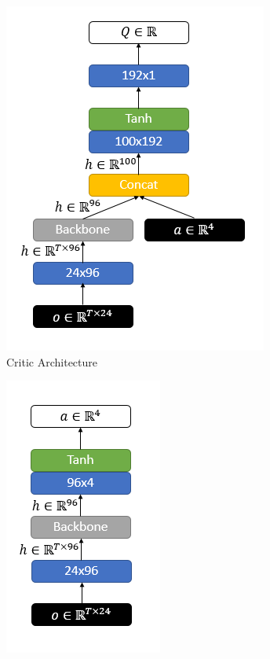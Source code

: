 \begin{figure}
	\begin{subfigure}{.5\textwidth}
		\centering
		\includegraphics[width=0.97\linewidth]{figures/nets/critic.png}
		\caption{Critic Architecture}
		\label{fig:critic_net}
	\end{subfigure}
	\begin{subfigure}{.5\textwidth}
		\centering
		\includegraphics[width=0.55\linewidth]{figures/nets/actor.png}

\end{subfigure}
\end{figure}
